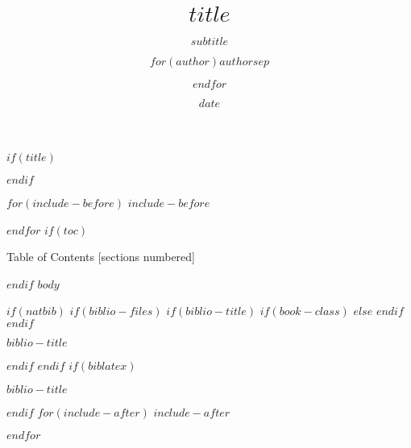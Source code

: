 \documentclass[$if(fontsize)$$fontsize$,$endif$$if(lang)$$babel-lang$,$endif$$if(handout)$handout,$endif$$if(beamer)$gnorenonframetext,$endif$$for(classoption)$$classoption$$sep$,$endfor$$if(make149)$,aspectratio=149$endif$]{$documentclass$}
\title{$title$}
\subtitle{$subtitle$}
\author{$for(author)$$author$$sep$ \and $endfor$}
\date{$date$}
\institute{$institute$}
\begin{document}
$if(title)$
\maketitle
$endif$

$for(include-before)$
$include-before$

$endfor$
$if(toc)$
\begin{frame}{Table of Contents}
  [sections numbered]
  \tableofcontents[hideallsubsections]
\end{frame}

$endif$
$body$


$if(natbib)$
$if(biblio-files)$
$if(biblio-title)$
$if(book-class)$
\renewcommand\bibname{$biblio-title$}
$else$
\renewcommand\refname{$biblio-title$}
$endif$
$endif$
\begin{frame}{$biblio-title$}

\end{frame}

$endif$
$endif$
$if(biblatex)$
\begin{frame}{$biblio-title$}

\end{frame}

$endif$
$for(include-after)$
$include-after$

$endfor$
\end{document}
